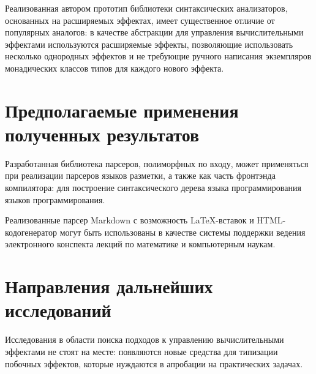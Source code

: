  Реализованная автором прототип библиотеки синтаксических анализаторов, основанных
  на расширяемых эффектах, имеет существенное отличие от популярных аналогов: в качестве абстракции для управления вычислительными эффектами используются расширяемые эффекты, 
  позволяющие использовать несколько однородных эффектов и не требующие ручного 
  написания экземпляров монадических классов типов для каждого нового эффекта.  


\section{Предполагаемые применения полученных результатов}

  Разработанная библиотека парсеров, полиморфных по входу, может применяться 
  при реализации парсеров языков разметки, а также как часть фронтэнда компилятора: 
  для построение синтаксического дерева языка программирования языков программирования. 

  Реализованные парсер Markdown с возможность \LaTeX-вставок и HTML-кодогенератор 
  могут быть использованы в качестве системы поддержки ведения электронного конспекта
  лекций по математике и компьютерным наукам. 

\section{Направления дальнейших исследований}

  Исследования в области поиска подходов к управлению вычислительными эффектами 
  не стоят на месте: появляются новые средства для типизации побочных эффектов, 
  которые нуждаются в апробации на практических задачах. 
